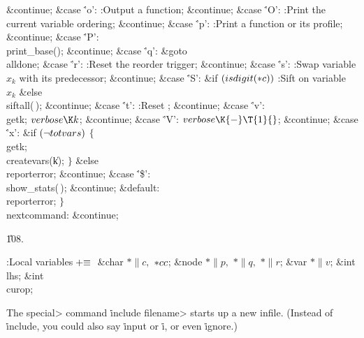 \&{continue};\6
\4\&{case} \.{'o'}:\5
:Output a function\X;\5
\&{continue};\6
\4\&{case} \.{'O'}:\5
:Print the current variable ordering\X;\5
\&{continue};\6
\4\&{case} \.{'p'}:\5
:Print a function or its profile\X;\5
\&{continue};\6
\4\&{case} \.{'P'}:\5
\\{print\_base}();\5
\&{continue};\6
\4\&{case} \.{'q'}:\5
\&{goto} \\{alldone};\6
\4\&{case} \.{'r'}:\5
:Reset the reorder trigger\X;\5
\&{continue};\6
\4\&{case} \.{'s'}:\5
:Swap variable $x_k$ with its predecessor\X;\5
\&{continue};\6
\4\&{case} \.{'S'}:\6
\&{if} ${}(\\{isdigit}({*}\|c)){}$\1\5
:Sift on variable $x_k$\X\2\6
\&{else}\1\5
\\{siftall}(\,);\5
\2\&{continue};\6
\4\&{case} \.{'t'}:\5
:Reset \X;\5
\&{continue};\6
\4\&{case} \.{'v'}:\5
\\{getk};\5
${}\\{verbose}\K\|k{}$;\5
\&{continue};\6
\4\&{case} \.{'V'}:\5
${}\\{verbose}\K{-}\T{1}{}$;\5
\&{continue};\6
\4\&{case} \.{'x'}:\6
\&{if} ${}(\lnot\\{totvars}){}$\5
${}\{{}$\5
\1\\{getk};\5
\\{createvars}(\|k);\6
\4${}\}{}$\5
\2\&{else}\1\5
\\{reporterror};\5
\2\&{continue};\6
\4\&{case} \.{'\$'}:\5
\\{show\_stats}(\,);\5
\&{continue};\6
\4\&{default}:\5
\\{reporterror};\6
\4${}\}{}$\2\6
\4\\{nextcommand}:\5
\&{continue};\par
\U108.\fi

\B{}:Local variables\X${}\mathrel+\equiv{}$\6
\&{char} ${}{*}\|c,{}$ ${}{*}\\{cc}{}$;\6
\&{node} ${}{*}\|p,{}$ ${}{*}\|q,{}$ ${}{*}\|r{}$;\6
\&{var} ${}{*}\|v{}$;\6
\&{int} \\{lhs};\6
\&{int} \\{curop};\par
\fi

The \<special> command \.{include} \<filename> starts up a new infile.
(Instead of \.{include}, you could also say \.{input} or \.i, or
even \.{ignore}.)

